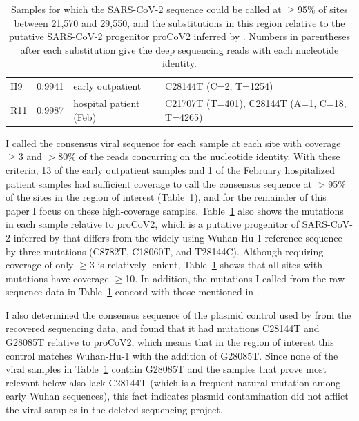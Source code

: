 \documentclass[9pt,twocolumn,twoside]{gsajnl_modified}
\begin{document}
\begin{table}[]
{\begin{tabular}{lrll}
H9 &                               0.9941 &        early outpatient &                                                     C28144T (C=2, T=1254)  \\
R11 &                               0.9987 &  hospital patient (Feb) &                               C21707T (T=401), C28144T (A=1, C=18, T=4265)  \\
\bottomrule
\end{tabular}
}
\caption{Samples for which the SARS-CoV-2 sequence could be called at $\ge$95\% of sites between 21,570 and 29,550, and the substitutions in this region relative to the putative SARS-CoV-2 progenitor proCoV2 inferred by \citet{kumar2021evolutionary}.
Numbers in parentheses after each substitution give the deep sequencing reads with each nucleotide identity.
\label{tab:mutations}
}
\end{table}

I called the consensus viral sequence for each sample at each site with coverage $\ge$3 and $>$80\% of the reads concurring on the nucleotide identity.
With these criteria, 13 of the early outpatient samples and 1 of the February hospitalized patient samples had sufficient coverage to call the consensus sequence at $>$95\% of the sites in the region of interest (Table~\ref{tab:mutations}), and for the remainder of this paper I focus on these high-coverage samples.
Table~\ref{tab:mutations} also shows the mutations in each sample relative to proCoV2, which is a putative progenitor of SARS-CoV-2 inferred by \citet{kumar2021evolutionary} that differs from the widely using Wuhan-Hu-1 reference sequence by three mutations (C8782T, C18060T, and T28144C).
Although requiring coverage of only $\ge$3 is relatively lenient, Table~\ref{tab:mutations} shows that all sites with mutations have coverage $\ge$10.
In addition, the mutations I called from the raw sequence data in Table~\ref{tab:mutations} concord with those mentioned in \citet{wang2020small}.

I also determined the consensus sequence of the plasmid control used by \citet{wang2020medRxiv} from the recovered sequencing data, and found that it had mutations C28144T and G28085T relative to proCoV2, which means that in the region of interest this control matches Wuhan-Hu-1 with the addition of G28085T.
Since none of the viral samples in Table~\ref{tab:mutations} contain G28085T and the samples that prove most relevant below also lack C28144T (which is a frequent natural mutation among early Wuhan sequences), this fact indicates plasmid contamination did not afflict the viral samples in the deleted sequencing project.
\end{document}
